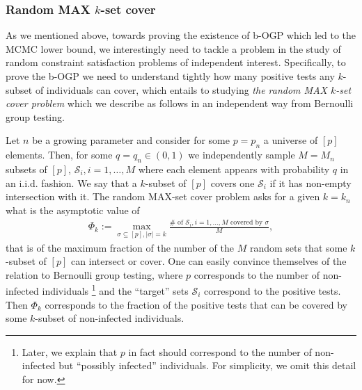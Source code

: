 \documentclass[12pt,reqno]{amsart}
\numberwithin{equation}{section}
\theoremstyle{definition}
\renewcommand{\[}{\begin{equation}}
\renewcommand{\]}{\end{equation}}
\renewcommand{\|}{\bigg{|}}
\begin{document}
\subsubsection{Random MAX $k$-set cover}\label{sec:intro_cover}
As we mentioned above, towards proving the existence of b-OGP which led to the MCMC lower bound, we interestingly need to tackle a problem in the study of random constraint satisfaction problems of independent interest. Specifically, to prove the b-OGP we need to understand tightly how many positive tests any $k$-subset of individuals can cover, which entails to studying \emph{the random MAX $k$-set cover problem} which we describe as follows in an independent way from Bernoulli group testing. 

 Let $n$ be a growing parameter and consider for some $p=p_n$ a universe of $[p]$ elements. Then, for some $q=q_n \in (0,1)$ we independently sample $M=M_n$ subsets of $[p]$, $\mathcal{S}_i, i=1,\ldots,M$ where each element appears with probability $q$ in an i.i.d. fashion. We say that a $k$-subset of $[p]$ covers one $\mathcal{S}_i$ if it has non-empty intersection with it.  The random MAX-set cover problem asks for a given $k=k_n$ what is the asymptotic value of \begin{align}\label{max_sat}
    \Phi_k:=\max_{\sigma \subseteq [p], |\sigma|=k} \frac{\# \text{ of } \mathcal{S}_i, i=1,\ldots,M \text{ covered by }\sigma}{M},
\end{align}that is of the maximum fraction of the number of the $M$ random sets that some $k$-subset of $[p]$ can intersect or cover. One can easily convince themselves of the relation to Bernoulli group testing, where $p$ corresponds to the number of non-infected individuals \footnote{Later, we explain that $p$ in fact should correspond to the number of non-infected but ``possibly infected'' individuals. For simplicity, we omit this detail for now.} and the ``target'' sets $\mathcal{S}_i$ correspond to the positive tests. Then $\Phi_k$ corresponds to the fraction of the positive tests that can be covered by some $k$-subset of non-infected individuals.
\end{document}
